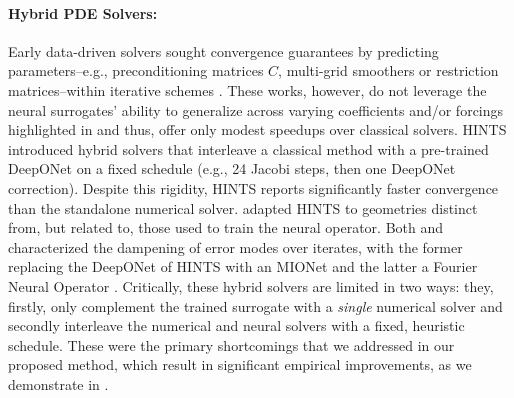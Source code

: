 \documentclass{article} %
\begin{document}
\paragraph{Hybrid PDE Solvers:}
Early data-driven solvers sought convergence guarantees by predicting parameters--e.g., preconditioning matrices $C$, multi-grid smoothers or restriction matrices--within iterative schemes \citep{taghibakhshi2021optimization,caldana2024deep,kopanivcakova2025deeponet,huang2022learning,katrutsa2020black}. These works, however, do not leverage the neural surrogates' ability to generalize across varying coefficients and/or forcings highlighted in  and thus, offer only modest speedups over classical solvers. HINTS \citep{zhang2024blending} introduced hybrid solvers that interleave a classical method with a pre-trained DeepONet on a fixed schedule (e.g., 24 Jacobi steps, then one DeepONet correction).
Despite this rigidity, HINTS reports significantly faster convergence than the standalone numerical solver. 
\citet{kahana2023geometry} adapted HINTS to geometries distinct from, but related to, those used to train the neural operator. Both \citet{hu2025hybrid} and \citet{cui2022fourier} characterized the dampening of error modes over iterates, with the former replacing the DeepONet of HINTS with an MIONet \citep{jin2022mionet} and the latter a Fourier Neural Operator \citep{li2020fourier}. Critically, these hybrid solvers are limited in two ways: they, firstly, only complement the trained surrogate with a \textit{single} numerical solver and secondly interleave the numerical and neural solvers with a fixed, heuristic schedule. These were the primary shortcomings that we addressed in our proposed method, which result in significant empirical improvements, as we demonstrate in .
\end{document}
